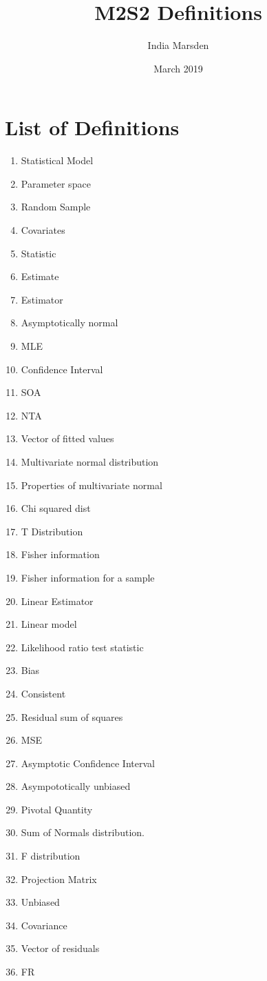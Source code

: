 \documentclass{article}
\title{M2S2 Definitions}
\author{India Marsden }
\date{March 2019}
\begin{document}
\maketitle
\section*{List of Definitions}
\begin{enumerate}
    \item Statistical Model
    \item Parameter space
    \item Random Sample
    \item Covariates
    \item Statistic
    \item Estimate
    \item Estimator
    \item Asymptotically normal
    \item MLE 
    \item Confidence Interval
    \item SOA
    \item NTA
    \item Vector of fitted values
    \item Multivariate normal distribution
    \item Properties of multivariate normal
    \item Chi squared dist
    \item T Distribution
    \item Fisher information
    \item Fisher information for a sample 
    \item Linear Estimator
    \setcounter{enumi}{10}
    \item Linear model
    \item Likelihood ratio test statistic
    \item Bias
    \item Consistent
    \item Residual sum of squares
    \item MSE
    \item Asymptotic Confidence Interval
    \item Asympototically unbiased
    \item Pivotal Quantity
    \item Sum of Normals distribution.
    \item F distribution
    \item Projection Matrix
    \item Unbiased
    \item Covariance
    \item Vector of residuals
    \item FR
\end{enumerate}
\end{document}
